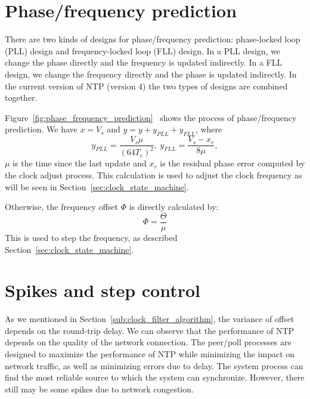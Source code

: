 

\section{Phase/frequency prediction}%
\label{sec:phase_frequency_prediction}
There are two kinds of designs for phase/frequency prediction: phase-locked
loop (PLL) design and frequency-locked loop (FLL) design. In a PLL design, we
change the phase directly and the frequency is updated indirectly. In a FLL
design, we change the frequency directly and the phase is updated indirectly.
In the current version of NTP (version 4) the two types of designs are combined
together. 

Figure~\ref{fig:phase_frequency_prediction}~\cite{redbook} shows the process of
phase/frequency prediction. We have $x = V_s$ and $y = y + y_{PLL} + y_{FLL}$,
where
\begin{equation}
    y_{PLL} = \frac{V_s\mu}{\left(64T_c\right)^2},\
    y_{FLL} = \frac{V_s-x_r}{8\mu},
    \label{eq:y_pll}
\end{equation}
$\mu$ is the time since the last update and $x_r$ is the residual phase
error computed by the clock adjust process. This calculation is used to adjust
the clock frequency as will be seen in Section~\ref{sec:clock_state_machine}.

Otherwise, the frequency offset $\Phi$ is directly calculated by:
\begin{equation}
    \Phi = \frac{\Theta}{\mu}
    \label{eq:frequency_offset}
\end{equation}
This is used to step the frequency, as described
Section~\ref{sec:clock_state_machine}. 




\section{Spikes and step control}%
\label{sec:spikes_and_step_control}
As we mentioned in Section~\ref{sub:clock_filter_algorithm}, the variance of
offset depends on the round-trip delay. We can observe that the performance of
NTP depends on the quality of the network connection. The peer/poll processes
are designed to maximize the performance of NTP while minimizing the impact on
network traffic, as well as minimizing errors due to delay. The system process
can find the most reliable source to which the system can synchronize. However,
there still may be some spikes due to network congestion. 

